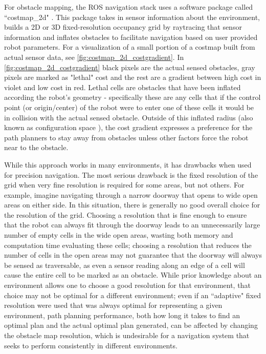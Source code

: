 For obstacle mapping, the ROS navigation stack uses a software package called ``costmap\_2d" . This package takes in sensor information about the environment, builds a 2D or 3D fixed-resolution occupancy grid by raytracing that sensor information and inflates obstacles to facilitate navigation based on user provided robot parameters. For a visualization of a small portion of a costmap built from actual sensor data, see \autoref{fig:costmap_2d_costgradient}. In \autoref{fig:costmap_2d_costgradient} black pixels are the actual sensed obstacles, gray pixels are marked as "lethal" cost and the rest are a gradient between high cost in violet and low cost in red. Lethal cells are obstacles that have been inflated according the robot's geometry - specifically these are any cells that if the control point (or origin/center) of the robot were to enter one of these cells it would be in collision with the actual sensed obstacle. Outside of this inflated radius (also known as configuration space ), the cost gradient expresses a preference for the path planners to stay away from obstacles unless other factors force the robot near to the obstacle.

While this approach works in many environments, it has drawbacks when used for precision navigation. The most serious drawback is the fixed resolution of the grid when very fine resolution is required for some areas, but not others. For example, imagine navigating through a narrow doorway that opens to wide open areas on either side. In this situation, there is generally no good overall choice for the resolution of the grid. Choosing a resolution that is fine enough to ensure that the robot can always fit through the doorway leads to an unnecessarily large number of empty cells in the wide open areas, wasting both memory and computation time evaluating these cells; choosing a resolution that reduces the number of cells in the open areas may not guarantee that the doorway will always be sensed as traversable, as even a sensor reading along an edge of a cell will cause the entire cell to be marked as an obstacle. While prior knowledge about an environment allows one to choose a good resolution for that environment, that choice may not be optimal for a different environment; even if an ``adaptive" fixed resolution were used that was always optimal for representing a given environment, path planning performance, both how long it takes to find an optimal plan and the actual optimal plan generated, can be affected by changing the obstacle map resolution, which is undesirable for a navigation system that seeks to perform consistently in different environments.

